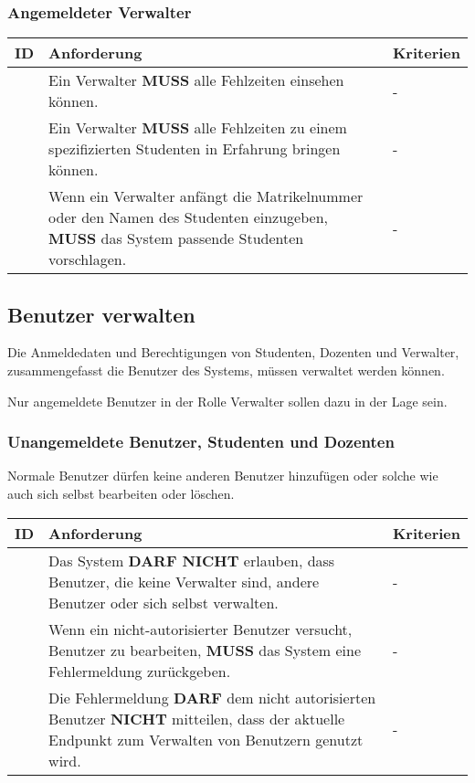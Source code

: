 \vspace{12pt}

\subsubsection{Angemeldeter Verwalter}
\begin{tabular} {|p{}|p{}|p{}|}
	\hline
	ID & Anforderung & Kriterien \\
	\hline
	\printfreqnr
	& Ein Verwalter \textbf{MUSS} alle Fehlzeiten einsehen können. 
	& - \\
	\hline
	\printfreqnr
	& Ein Verwalter \textbf{MUSS} alle Fehlzeiten zu einem spezifizierten Studenten in Erfahrung bringen können.
	& - \\ 
	\hline
	\printfreqnr
	& Wenn ein Verwalter anfängt die Matrikelnummer oder den Namen des Studenten einzugeben, \textbf{MUSS} das System passende Studenten vorschlagen.
	& - \\ 
	\hline
\end{tabular}

\newpage

\subsection{Benutzer verwalten}
Die Anmeldedaten und Berechtigungen von Studenten, Dozenten und Verwalter, zusammengefasst die Benutzer des Systems, müssen verwaltet werden können.

Nur angemeldete Benutzer in der Rolle Verwalter sollen dazu in der Lage sein.

\vspace{12pt}

\subsubsection{Unangemeldete Benutzer, Studenten und Dozenten}
Normale Benutzer dürfen keine anderen Benutzer hinzufügen oder solche wie auch sich selbst bearbeiten oder löschen.

\vspace{12pt}


\begin{tabular} {|p{}|p{}|p{}|}
	\hline
	ID & Anforderung & Kriterien \\
	\hline
	\printfreqnr
	& Das System \textbf{DARF NICHT} erlauben, dass Benutzer, die keine Verwalter sind, andere Benutzer oder sich selbst verwalten. 
	& - \\
	\hline
	\printfreqnr
	& Wenn ein nicht-autorisierter Benutzer versucht, Benutzer zu bearbeiten, \textbf{MUSS} das System eine Fehlermeldung zurückgeben.
	& - \\ 
	\hline
	\printfreqnr
	& Die Fehlermeldung \textbf{DARF} dem nicht autorisierten Benutzer \textbf{NICHT} mitteilen, dass der aktuelle Endpunkt zum Verwalten von Benutzern genutzt wird.
	& - \\ 
	\hline
\end{tabular}

